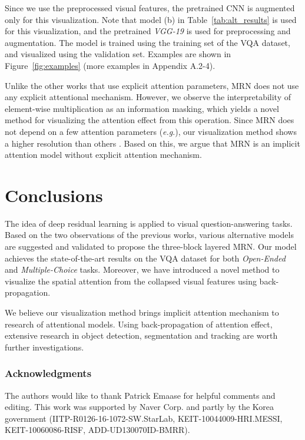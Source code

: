 \documentclass{article}
\newcommand{\onedot}[0]{.\xspace}
\newcommand{\eg}[0]{\emph{e.g}\onedot}
\begin{document}
Since we use the preprocessed visual features, the pretrained CNN is augmented only for this visualization. Note that model (b) in Table~\ref{tab:alt_results} is used for this visualization, and the pretrained \textit{VGG-19} is used for preprocessing and augmentation. The model is trained using the training set of the VQA dataset, and visualized using the validation set. Examples are shown in Figure~\ref{fig:examples} (more examples in Appendix A.2-4). 

Unlike the other works \cite{Yang2015,Xiong2016} that use explicit attention parameters, MRN does not use any explicit attentional mechanism. However, we observe the interpretability of element-wise multiplication as an information masking, which yields a novel method for visualizing the attention effect from this operation. Since MRN does not depend on a few attention parameters (\eg ), our visualization method shows a higher resolution than others \cite{Yang2015,Xiong2016}. Based on this, we argue that MRN is an implicit attention model without explicit attention mechanism.

\section{Conclusions}

The idea of deep residual learning is applied to visual question-answering tasks. Based on the two observations of the previous works, various alternative models are suggested and validated to propose the three-block layered MRN. Our model achieves the state-of-the-art results on the VQA dataset for both \textit{Open-Ended} and \textit{Multiple-Choice} tasks. Moreover, we have introduced a novel method to visualize the spatial attention from the collapsed visual features using back-propagation. 

We believe our visualization method brings implicit attention mechanism to research of attentional models. Using back-propagation of attention effect, extensive research in object detection, segmentation and tracking are worth further investigations.

\subsubsection*{Acknowledgments}

The authors would like to thank Patrick Emaase for helpful comments and editing. This work was supported by Naver Corp. and partly by the Korea government (IITP-R0126-16-1072-SW.StarLab, KEIT-10044009-HRI.MESSI, KEIT-10060086-RISF, ADD-UD130070ID-BMRR).
\end{document}
